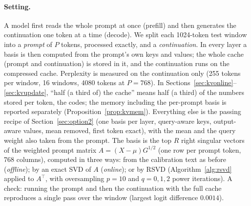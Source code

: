 \documentclass[10pt]{article}
\theoremstyle{plain}
\theoremstyle{definition}
\theoremstyle{remark}
\newcommand{\T}{^{\top}}
\begin{document}
\paragraph{Setting.}
A model first reads the whole prompt at once (prefill) and then generates the continuation one token at a time (decode). We split each 1024-token test window into a \emph{prompt} of $P$ tokens, processed exactly, and a \emph{continuation}. In every layer a basis is then computed from the prompt's own keys and values; the whole cache (prompt and continuation) is stored in it, and the continuation runs on the compressed cache. Perplexity is measured on the continuation only (255 tokens per window, 16 windows, 4080 tokens at $P=768$). In Sections~\ref{sec:kvonline}--\ref{sec:kvupdate}, ``half (a third of) the cache'' means half (a third) of the numbers stored per token, the codes; the memory including the per-prompt basis is reported separately (Proposition~\ref{prop:kvmem}). Everything else is the passing recipe of Section~\ref{sec:option2} (one basis per layer, query-aware keys, output-aware values, mean removed, first token exact), with the mean and the query weight also taken from the prompt. The basis is the top $R$ right singular vectors of the weighted prompt matrix $A=(X-\mu)G^{1/2}$ (one row per prompt token, 768 columns), computed in three ways: from the calibration text as before (\emph{offline}); by an exact SVD of $A$ (\emph{online}); or by RSVD (Algorithm~\ref{alg:rsvd} applied to $A\T$, with oversampling $p=10$ and $q=0,1,2$ power iterations). A check: running the prompt and then the continuation with the full cache reproduces a single pass over the window (largest logit difference $0.0014$).
\end{document}
